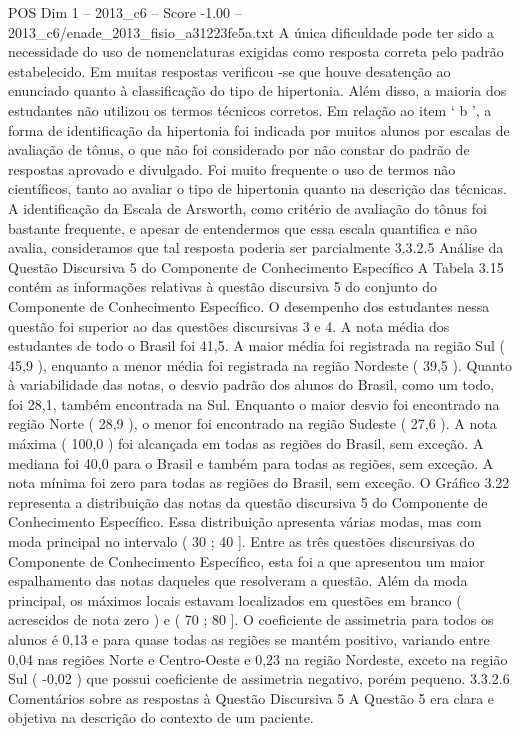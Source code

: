 \begin{textsample}{POS Dim 1 – 2013\_c6 – Score -1.00 – 2013\_c6/enade\_2013\_fisio\_a31223fe5a.txt}
A única dificuldade pode ter sido a necessidade do uso de nomenclaturas exigidas como resposta correta pelo padrão estabelecido.
Em muitas respostas verificou -se que houve desatenção ao enunciado quanto à classificação do tipo de hipertonia.
Além disso, a maioria dos estudantes não utilizou os termos técnicos corretos.
Em relação ao item ‘ b ’, a forma de identificação da hipertonia foi indicada por muitos alunos por escalas de avaliação de tônus, o que não foi considerado por não constar do padrão de respostas aprovado e divulgado.
Foi muito frequente o uso de termos não científicos, tanto ao avaliar o tipo de hipertonia quanto na descrição das técnicas.
A identificação da Escala de Arsworth, como critério de avaliação do tônus foi bastante frequente, e apesar de entendermos que essa escala quantifica e não avalia, consideramos que tal resposta poderia ser parcialmente 3.3.2.5 Análise da Questão Discursiva 5 do Componente de Conhecimento Específico A Tabela 3.15 contém as informações relativas à questão discursiva 5 do conjunto do Componente de Conhecimento Específico.
O desempenho dos estudantes nessa questão foi superior ao das questões discursivas 3 e 4.
A nota média dos estudantes de todo o Brasil foi 41,5.
A maior média foi registrada na região Sul ( 45,9 ), enquanto a menor média foi registrada na região Nordeste ( 39,5 ).
Quanto à variabilidade das notas, o desvio padrão dos alunos do Brasil, como um todo, foi 28,1, também encontrada na Sul.
Enquanto o maior desvio foi encontrado na região Norte ( 28,9 ), o menor foi encontrado na região Sudeste ( 27,6 ).
A nota máxima ( 100,0 ) foi alcançada em todas as regiões do Brasil, sem exceção.
A mediana foi 40,0 para o Brasil e também para todas as regiões, sem exceção.
A nota mínima foi zero para todas as regiões do Brasil, sem exceção.
O Gráfico 3.22 representa a distribuição das notas da questão discursiva 5 do Componente de Conhecimento Específico.
Essa distribuição apresenta várias modas, mas com moda principal no intervalo ( 30 ; 40 ].
Entre as três questões discursivas do Componente de Conhecimento Específico, esta foi a que apresentou um maior espalhamento das notas daqueles que resolveram a questão.
Além da moda principal, os máximos locais estavam localizados em questões em branco ( acrescidos de nota zero ) e ( 70 ; 80 ].
O coeficiente de assimetria para todos os alunos é 0,13 e para quase todas as regiões se mantém positivo, variando entre 0,04 nas regiões Norte e Centro-Oeste e 0,23 na região Nordeste, exceto na região Sul ( -0,02 ) que possui coeficiente de assimetria negativo, porém pequeno. 3.3.2.6 Comentários sobre as respostas à Questão Discursiva 5 A Questão 5 era clara e objetiva na descrição do contexto de um paciente.

\end{textsample}
